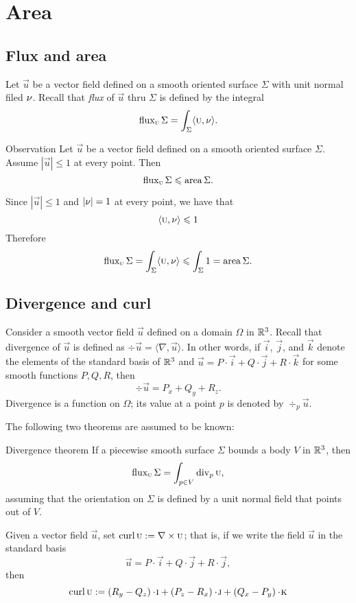 \chapter{Area}

\section{Flux and area}

Let $\vec u$ be a vector field defined on a smooth oriented surface $\Sigma$ with unit normal filed $\nu$.
Recall that \emph{flux} of $\vec u$ thru $\Sigma$ is defined by the integral 
\[\mathop{\rm flux}\nolimits_{\textsc u}\Sigma=\int_\Sigma \langle \textsc u,\nu\rangle.\]

\begin{thm}{Observation}\label{obs:flux}
Let $\vec u$ be a vector field defined on a smooth oriented surface $\Sigma$.
Assume $|\vec u|\le 1$ at every point.
Then 
\[\mathop{\rm flux}\nolimits_{\textsc u}\Sigma \leqslant \mathop{\rm area}\nolimits\Sigma.\]
\end{thm}

Since $|\vec u|\le 1$ and $|\nu|=1$ at every point,
we have that
\[\langle\textsc u,\nu\rangle\leqslant 1\]
Therefore 
\[\mathop{\rm flux}\nolimits_{\textsc u}\Sigma=\int_\Sigma \langle\textsc u,\nu\rangle\leqslant \int_\Sigma1=\mathop{\rm area}\nolimits\Sigma.\]
\qedsf
\section{Divergence and curl}


Consider a smooth vector field $\vec u$ defined on a domain $\Omega$ in $\mathbb{R}^3$.
Recall that divergence of $\vec u$ is defined as $\div\vec u=\langle \nabla,\vec u\rangle$.
In other words, if $\vec i$, $\vec j$, and $\vec k$ denote the elements of the standard basis of  $\mathbb{R}^3$ and
$\vec u=P\cdot \vec i+Q\cdot\vec j+R\cdot\vec k$
for some smooth functions $P,Q,R$,
then
\[\div\vec u= P_x+Q_y+R_z.\]
Divergence is a function on $\Omega$;
its value at a point $p$ is denoted by $\div_p\vec u$.

The following two theorems are assumed to be known:

\begin{thm}{Divergence theorem}\label{thm:div}
If a piecewise smooth surface $\Sigma$ bounds a body $V$ in $\mathbb{R}^3$, then
\[\mathop{\rm flux}\nolimits_{\textsc u}\Sigma=\int_{p\in V}\mathop{\rm div}\nolimits_p \textsc u,\]
assuming that the orientation on $\Sigma$ is defined by a unit normal field that points out of $V$.
\end{thm}

Given a vector field $\vec u$, set $\mathop{\rm curl}\nolimits \textsc u:=\nabla\times \textsc u$;
that is, if we write the field $\vec u$ in the standard basis 
\[\vec u=P\cdot \vec i+ Q\cdot\vec j+R\cdot \vec j,\]
then 
\[\curl \vec u
\df
\left(R_y-Q_z \right)\cdot \vec i 
+
\left(P_z-R_x\right) \cdot \vec j
+
\left (Q_x-P_y\right)\cdot \vec k \]

